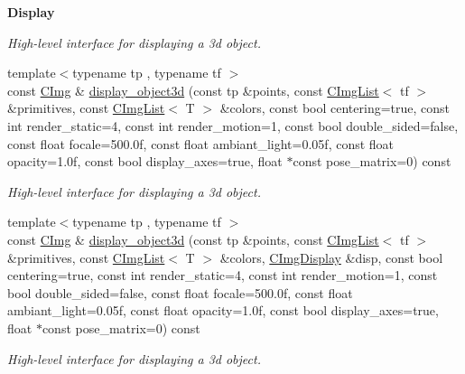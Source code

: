 \begin{Indent}{\bf Display}
\begin{DoxyCompactItemize}
\begin{DoxyCompactList}\small\item\em High-\/level interface for displaying a 3d object. \item\end{DoxyCompactList}\item 
\hypertarget{structcimg__library_1_1_c_img_a38bf4b3eaea13b3c8a5cb1eca4ef5d20}{
{\footnotesize template$<$typename tp , typename tf $>$ }\\const \hyperlink{structcimg__library_1_1_c_img}{CImg} \& \hyperlink{structcimg__library_1_1_c_img_a38bf4b3eaea13b3c8a5cb1eca4ef5d20}{display\_\-object3d} (const tp \&points, const \hyperlink{structcimg__library_1_1_c_img_list}{CImgList}$<$ tf $>$ \&primitives, const \hyperlink{structcimg__library_1_1_c_img_list}{CImgList}$<$ T $>$ \&colors, const bool centering=true, const int render\_\-static=4, const int render\_\-motion=1, const bool double\_\-sided=false, const float focale=500.0f, const float ambiant\_\-light=0.05f, const float opacity=1.0f, const bool display\_\-axes=true, float $\ast$const pose\_\-matrix=0) const }
\label{structcimg__library_1_1_c_img_a38bf4b3eaea13b3c8a5cb1eca4ef5d20}

\begin{DoxyCompactList}\small\item\em High-\/level interface for displaying a 3d object. \item\end{DoxyCompactList}\item 
\hypertarget{structcimg__library_1_1_c_img_a306a98185e06a625a00177ddbb2d441f}{
{\footnotesize template$<$typename tp , typename tf $>$ }\\const \hyperlink{structcimg__library_1_1_c_img}{CImg} \& \hyperlink{structcimg__library_1_1_c_img_a306a98185e06a625a00177ddbb2d441f}{display\_\-object3d} (const tp \&points, const \hyperlink{structcimg__library_1_1_c_img_list}{CImgList}$<$ tf $>$ \&primitives, const \hyperlink{structcimg__library_1_1_c_img_list}{CImgList}$<$ T $>$ \&colors, \hyperlink{structcimg__library_1_1_c_img_display}{CImgDisplay} \&disp, const bool centering=true, const int render\_\-static=4, const int render\_\-motion=1, const bool double\_\-sided=false, const float focale=500.0f, const float ambiant\_\-light=0.05f, const float opacity=1.0f, const bool display\_\-axes=true, float $\ast$const pose\_\-matrix=0) const }
\label{structcimg__library_1_1_c_img_a306a98185e06a625a00177ddbb2d441f}

\begin{DoxyCompactList}\small\item\em High-\/level interface for displaying a 3d object. \item\end{DoxyCompactList}\end{DoxyCompactItemize}
\end{Indent}

